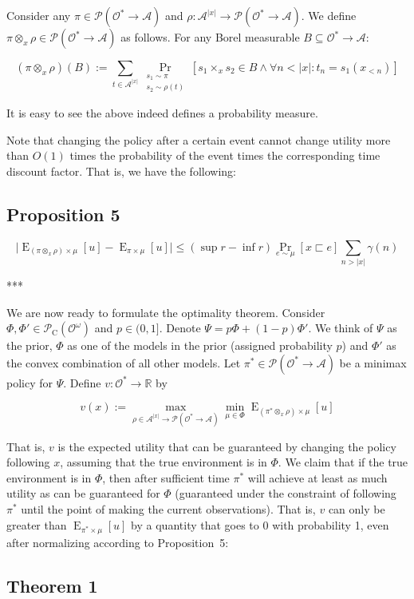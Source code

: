 \documentclass[a4paper]{article}
\DeclareMathOperator{\Prb}{Pr}
\DeclareMathOperator{\E}{E}
\newcommand{\PP}[2]{\operatorname{Pr}_{\substack{#1 \\ #2}}}
\newcommand{\Reals}{\mathbb{R}}
\newcommand{\Abs}[1]{\lvert #1 \rvert}
\newcommand{\Prob}{\mathcal{P}}
\newcommand{\Act}{\mathcal{A}}
\newcommand{\Obs}{\mathcal{O}}
\newcommand{\ObsO}{\Obs^\omega}
\newcommand{\Pol}{\Obs^* \rightarrow \Act}
\newcommand{\CC}{\mathcal{P}_{\operatorname{C}}}
\begin{document}
Consider any ${\pi \in \Prob(\Pol)}$ and ${\rho: \Act^{\Abs{x}} \rightarrow \Prob(\Pol)}$. We define ${\pi \otimes_x \rho \in \Prob(\Obs^* \rightarrow \Act)}$ as follows. For any Borel measurable ${B \subseteq \Pol}$:

$$(\pi \otimes_x \rho)(B):=\sum_{t \in \Act^{\Abs{x}}} \PP{s_1 \sim \pi}{s_2 \sim \rho(t)}[s_1 \times_x s_2 \in B \land \forall n < \Abs{x}: t_n=s_1(x_{<n})]$$ 

It is easy to see the above indeed defines a probability measure.

Note that changing the policy after a certain event cannot change utility more than ${O(1)}$ times the probability of the event times the corresponding time discount factor. That is, we have the following:

\subsection{Proposition 5}

$$\Abs{\E_{(\pi \otimes_x \rho) \times \mu}[u]-\E_{\pi \times \mu}[u]} \leq (\sup r - \inf r) \Prb_{e \sim \mu}[x \sqsubset e] \sum_{n > \Abs{x}} \gamma(n)$$

***

We are now ready to formulate the optimality theorem. Consider ${\Phi,\Phi' \in \CC(\ObsO)}$ and ${p \in (0,1]}$. Denote ${\Psi = p \Phi + (1-p) \Phi'}$. We think of ${\Psi}$ as the prior, ${\Phi}$ as one of the models in the prior (assigned probability ${p}$) and ${\Phi'}$ as the convex combination of all other models. Let ${\pi^* \in \Prob(\Pol)}$ be a minimax policy for ${\Psi}$. Define ${v: \Obs^* \rightarrow \Reals}$ by

$$v(x):=\max_{\rho \in \Act^{\Abs{x}} \rightarrow \Prob(\Pol)} \min_{\mu \in \Phi} \E_{(\pi^* \otimes_x \rho) \times \mu}[u]$$

That is, ${v}$ is the expected utility that can be guaranteed by changing the policy following ${x}$, assuming that the true environment is in ${\Phi}$. We claim that if the true environment is in ${\Phi}$, then after sufficient time ${\pi^*}$ will achieve at least as much utility as can be guaranteed for ${\Phi}$ (guaranteed under the constraint of following ${\pi^*}$ until the point of making the current observations). That is, ${v}$ can only be greater than ${\E_{\pi^* \times \mu}[u]}$ by a quantity that goes to 0 with probability 1, even after normalizing according to Proposition~5:

\subsection{Theorem 1}
\end{document}
